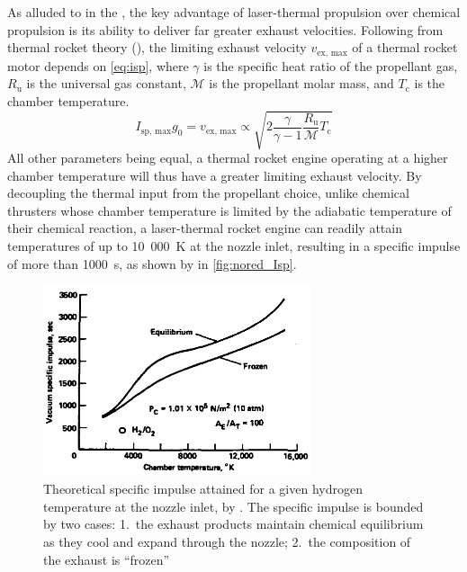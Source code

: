         As alluded to in the , the key advantage of laser-thermal propulsion over chemical propulsion is its ability to deliver far greater exhaust velocities. Following from thermal rocket theory (\textcite{zandbergenAE4S01ThermalRocket2020}), the limiting exhaust velocity $v_\text{ex, max}$ of a thermal rocket motor depends on \autoref{eq:isp}, where $\gamma$ is the specific heat ratio of the propellant gas, $R_\text{u}$ is the universal gas constant, $\mathcal{M}$ is the propellant molar mass, and $T_\text{c}$ is the chamber temperature.
        \begin{equation}
            I_\text{sp, max}g_0 = v_\text{ex, max} \propto \sqrt{2\frac{\gamma}{\gamma-1}\frac{R_\text{u}}{\mathcal{M}}T_\text{c}} \label{eq:isp}
        \end{equation}
        All other parameters being equal, a thermal rocket engine operating at a higher chamber temperature will thus have a greater limiting exhaust velocity. By decoupling the thermal input from the propellant choice, unlike chemical thrusters whose chamber temperature is limited by the adiabatic temperature of their chemical reaction, a laser-thermal rocket engine can readily attain temperatures of up to 10~000~K at the nozzle inlet, resulting in a specific impulse of more than 1000~s, as shown by \textcite{noredApplicationHighPower1976} in \autoref{fig:nored_Isp}.

        \begin{figure}[h]
            \centering
            \includegraphics[width=0.7\textwidth]{assets/2 background/nored_ltpIsp.png}
            \caption[Theoretical specific impulse attained for a given hydrogen temperature]{Theoretical specific impulse attained for a given hydrogen temperature at the nozzle inlet, by \textcite{noredApplicationHighPower1976}. The specific impulse is bounded by two cases: 1.~the exhaust products maintain chemical equilibrium as they cool and expand through the nozzle; 2.~the composition of the exhaust is ``frozen''}
            \label{fig:nored_Isp}
        \end{figure}

